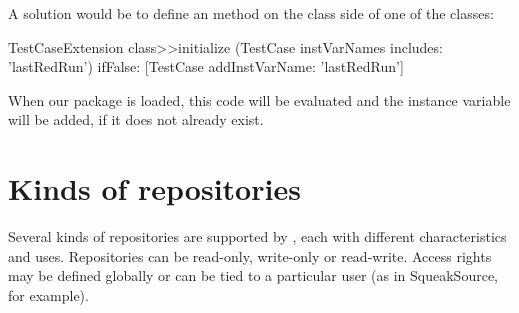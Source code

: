 \documentclass[a4paper,10pt,twoside]{book}
\begin{document}
A solution would be to define an  method on the class side of one of the classes:

\begin{code}{}
TestCaseExtension class>>initialize
	(TestCase instVarNames includes: 'lastRedRun') 
		ifFalse: [TestCase addInstVarName: 'lastRedRun']
\end{code}

When our package is loaded, this code will be evaluated and the instance variable will be added, if it does not already exist.








\section{Kinds of repositories}

Several kinds of repositories are supported by \MC, each with different characteristics and uses. Repositories can be read-only, write-only or read-write. Access rights may be defined globally or can be tied to a particular user (as in SqueakSource, for example).
\end{document}
